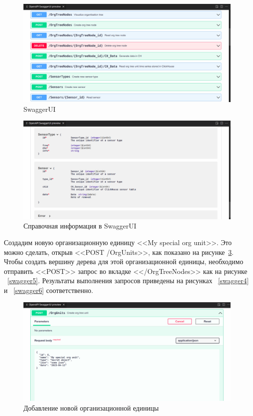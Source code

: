 \begin{figure}
    \includegraphics[scale=0.2]{img/swagger1.png}
    \caption{SwaggerUI}
    \label{swagger1}
\end{figure}

\begin{figure}
    \includegraphics[scale=0.2]{img/swagger2.png}
    \caption{Справочная информация в SwaggerUI}
    \label{swagger2}
\end{figure}

Создадим новую организационную единицу <<My special org unit>>. Это можно сделать, открыв <<POST /OrgUnits>>, как показано на рисунке~\ref{swagger3}. Чтобы создать вершину дерева для этой организационной единицы, необходимо отправить <<POST>> запрос во вкладке <</OrgTreeNodes>> как на рисунке ~\ref{swagger5}. Результаты выполнения запросов приведены на рисунках ~\ref{swagger4} и ~\ref{swagger6} соответственно.

\begin{figure}
    \includegraphics[scale=0.2]{img/swagger3.png}
    \caption{Добавление новой организационной единицы}
    \label{swagger3}
\end{figure}

